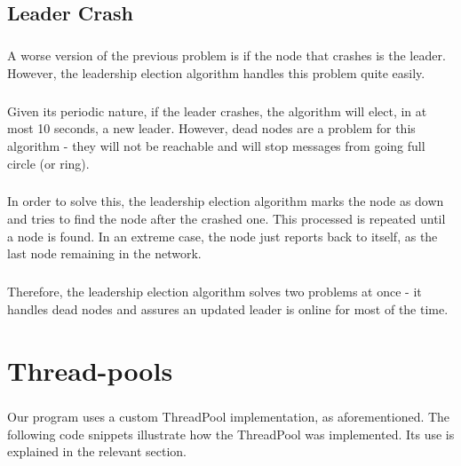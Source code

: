 \documentclass{report}
\begin{document}
     \section{Leader Crash}
     		
     		\paragraph{}A worse version of the previous problem is if the node that crashes is the leader. However, the leadership election algorithm handles this problem quite easily.
     		
     		\paragraph{}Given its periodic nature, if the leader crashes, the algorithm will elect, in at most 10 seconds, a new leader. However, dead nodes are a problem for this algorithm - they will not be reachable and will stop messages from going full circle (or ring). 
     		
     		\paragraph{}In order to solve this, the leadership election algorithm marks the node as down and tries to find the node after the crashed one. This processed is repeated until a node is found. In an extreme case, the node just reports back to itself, as the last node remaining in the network.
     		
     		\paragraph{}Therefore, the leadership election algorithm solves two problems at once - it handles dead nodes and assures an updated leader is online for most of the time.

	\chapter{Thread-pools}
	
	        \paragraph{}Our program uses a custom ThreadPool implementation, as aforementioned. The following code snippets illustrate how the ThreadPool was implemented. Its use is explained in the relevant section.
	        
\end{document}
